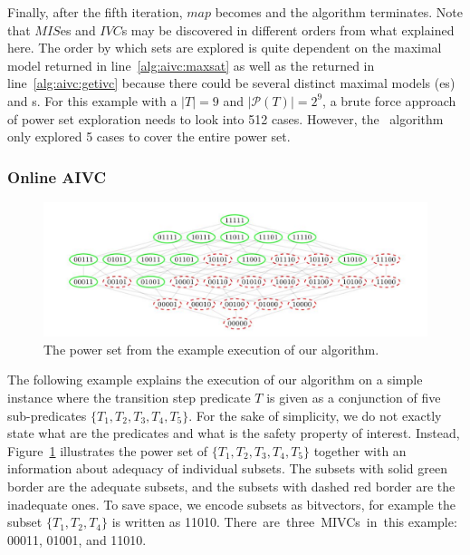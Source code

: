 Finally, after the fifth iteration, $map$ becomes \unsat and the algorithm terminates.
Note that $MIS$es and $IVC$s may be discovered in different orders from what explained here. The order by which sets are explored is
quite dependent on the maximal model returned in line~\ref{alg:aivc:maxsat} as well as the \mivc returned in line~\ref{alg:aivc:getivc} because there could be several distinct maximal models (\mis es) and \mivc s. For this example with a $|T| = 9$ and $|\mathcal{P}(T)| = 2^9$, a brute force approach of power set exploration needs to look into 512  cases. However, the \aivcalg ~algorithm only explored 5 cases to cover the entire power set. %


\subsubsection{Online AIVC}
\begin{figure}[t]
\centering
  \includegraphics[width=\columnwidth]{figs/growshrink.jpg}
  \vspace{-0.1in}
\caption{The power set from the example execution of our algorithm.}
\label{fig:running_cube}
\end{figure}

The following example explains the execution of our algorithm on a simple instance where the transition step predicate $T$ is given as a conjunction of five sub-predicates $\{T_1, T_2, T_3, T_4, T_5\}$.
For the sake of simplicity, we do not exactly state what are the predicates and what is the safety property of interest. Instead, Figure~\ref{fig:running_cube} illustrates the power set of $\{T_1, T_2, T_3, T_4, T_5\}$ together with an information about adequacy of individual subsets. The subsets with solid green border are the adequate subsets, and the subsets with dashed red border are the inadequate ones. To save space, we encode subsets as bitvectors, for example the subset $\{T_1, T_2, T_4\}$ is written as 11010. There~are~three~MIVCs~in~this example: 00011, 01001, and 11010.

